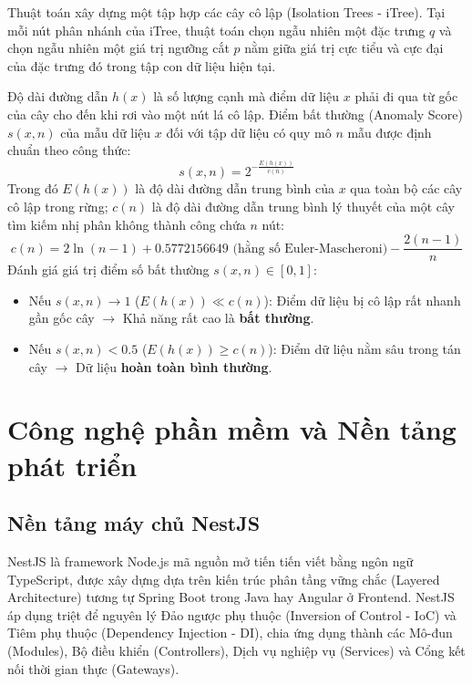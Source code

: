 Thuật toán xây dựng một tập hợp các cây cô lập (Isolation Trees - iTree). Tại mỗi nút phân nhánh của iTree, thuật toán chọn ngẫu nhiên một đặc trưng $q$ và chọn ngẫu nhiên một giá trị ngưỡng cắt $p$ nằm giữa giá trị cực tiểu và cực đại của đặc trưng đó trong tập con dữ liệu hiện tại.

Độ dài đường dẫn $h(x)$ là số lượng cạnh mà điểm dữ liệu $x$ phải đi qua từ gốc của cây cho đến khi rơi vào một nút lá cô lập. Điểm bất thường (Anomaly Score) $s(x, n)$ của mẫu dữ liệu $x$ đối với tập dữ liệu có quy mô $n$ mẫu được định chuẩn theo công thức:
\begin{equation}
    s(x, n) = 2^{-\frac{E(h(x))}{c(n)}}
    \label{eq:isolation_score}
\end{equation}
Trong đó $E(h(x))$ là độ dài đường dẫn trung bình của $x$ qua toàn bộ các cây cô lập trong rừng; $c(n)$ là độ dài đường dẫn trung bình lý thuyết của một cây tìm kiếm nhị phân không thành công chứa $n$ nút:
\begin{equation}
    c(n) = 2 \ln(n - 1) + 0.5772156649 \text{ (hằng số Euler-Mascheroni)} - \frac{2(n - 1)}{n}
    \label{eq:euler_constant}
\end{equation}
Đánh giá giá trị điểm số bất thường $s(x, n) \in [0, 1]$:
\begin{itemize}
    \item Nếu $s(x, n) \to 1$ ($E(h(x)) \ll c(n)$): Điểm dữ liệu bị cô lập rất nhanh gần gốc cây $\rightarrow$ Khả năng rất cao là \textbf{bất thường}.
    \item Nếu $s(x, n) < 0.5$ ($E(h(x)) \ge c(n)$): Điểm dữ liệu nằm sâu trong tán cây $\rightarrow$ Dữ liệu \textbf{hoàn toàn bình thường}.
\end{itemize}

\section{Công nghệ phần mềm và Nền tảng phát triển}
\label{sec:cong_nghe_phan_mem}

\subsection{Nền tảng máy chủ NestJS}
NestJS là framework Node.js mã nguồn mở tiến tiến viết bằng ngôn ngữ TypeScript, được xây dựng dựa trên kiến trúc phân tầng vững chắc (Layered Architecture) tương tự Spring Boot trong Java hay Angular ở Frontend. NestJS áp dụng triệt để nguyên lý Đảo ngược phụ thuộc (Inversion of Control - IoC) và Tiêm phụ thuộc (Dependency Injection - DI), chia ứng dụng thành các Mô-đun (Modules), Bộ điều khiển (Controllers), Dịch vụ nghiệp vụ (Services) và Cổng kết nối thời gian thực (Gateways).


